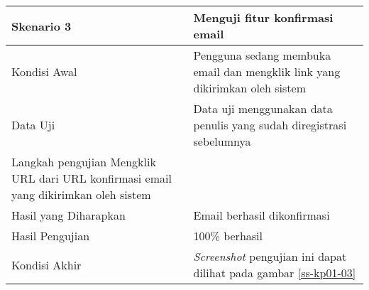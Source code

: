 \begin{longtable}{|X|X|}
		
	\textbf{Skenario 3}
		& Menguji fitur konfirmasi email \\ \hline
	Kondisi Awal
		& Pengguna sedang membuka email dan mengklik link yang dikirimkan oleh sistem \\ \hline
	Data Uji
		& Data uji menggunakan data penulis yang sudah diregistrasi sebelumnya \\ \hline
	Langkah pengujian
		Mengklik URL dari URL konfirmasi email yang dikirimkan oleh sistem \\ \hline
	Hasil yang Diharapkan
		& Email berhasil dikonfirmasi \\ \hline
	Hasil Pengujian
		& 100\% berhasil \\ \hline	
	Kondisi Akhir
		& \textit{Screenshot} pengujian ini dapat dilihat pada gambar \ref{ss-kp01-03}  \\ \hline	
\end{longtable}